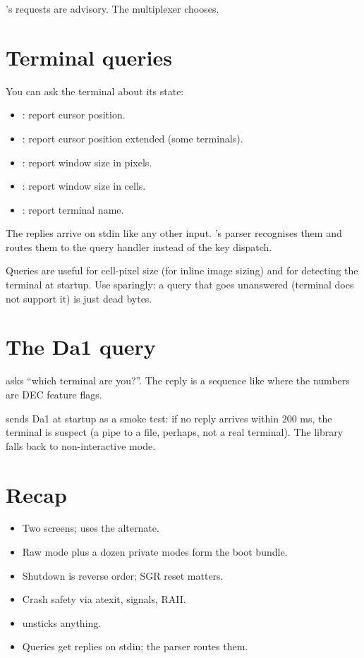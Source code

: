 \maya{}'s requests are advisory. The multiplexer chooses.

\section{Terminal queries}

You can ask the terminal about its state:

\begin{itemize}[leftmargin=*]
  \item \code{ESC [ 6 n}: report cursor position.
  \item \code{ESC [ ? 25 6 n}: report cursor position
    extended (some terminals).
  \item \code{ESC [ 14 t}: report window size in pixels.
  \item \code{ESC [ 18 t}: report window size in cells.
  \item \code{ESC [ > q}: report terminal name.
\end{itemize}

The replies arrive on stdin like any other input. \maya{}'s
parser recognises them and routes them to the query handler
instead of the key dispatch.

Queries are useful for cell-pixel size (for inline image
sizing) and for detecting the terminal at startup. Use
sparingly: a query that goes unanswered (terminal does not
support it) is just dead bytes.

\section{The Da1 query}

\code{ESC [ c} asks ``which terminal are you?''. The reply is
a sequence like \code{ESC [ ? 1 ; 2 c} where the numbers are
DEC feature flags.

\maya{} sends Da1 at startup as a smoke test: if no reply
arrives within 200 ms, the terminal is suspect (a pipe to a
file, perhaps, not a real terminal). The library falls back
to non-interactive mode.

\section{Recap}

\begin{recap}
\begin{itemize}[leftmargin=*]
  \item Two screens; \maya{} uses the alternate.
  \item Raw mode plus a dozen private modes form the boot
    bundle.
  \item Shutdown is reverse order; SGR reset matters.
  \item Crash safety via atexit, signals, RAII.
  \item {} unsticks anything.
  \item Queries get replies on stdin; the parser routes
    them.
\end{itemize}
\end{recap}

